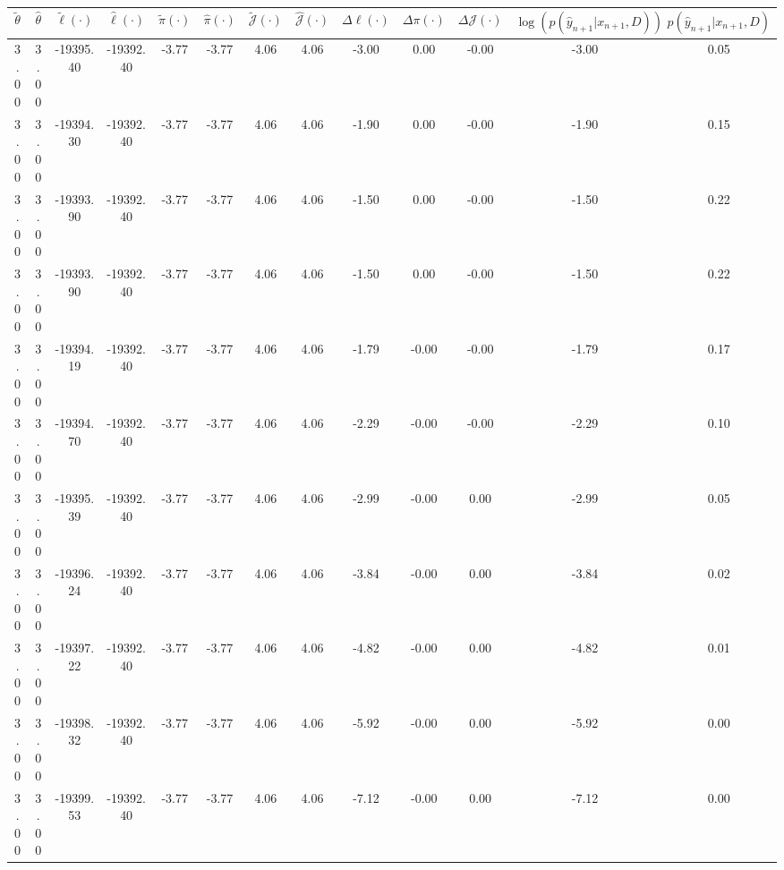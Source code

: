 \begin{table}[htbp]
        \centering
        \tiny
        \begin{adjustbox}{angle=90}
            \begin{tabular}{|c|c|c|c|c|c|c|c|c|c|c|c|c|}
                \hline
                 $\tilde{\theta}$ & $\hat{\theta}$ & $\tilde{\ell}(\cdot)$ & $\hat{\ell}(\cdot)$ & $\tilde{\pi}(\cdot)$ & $\hat{\pi}(\cdot)$ & $\tilde{\mathcal{J}}(\cdot)$ & $\hat{\mathcal{J}}(\cdot)$ & $\Delta \ell(\cdot)$ & $\Delta \pi(\cdot)$ & $\Delta \mathcal{J}(\cdot)$ & $\log(p(\hat{y}_{n+1}|x_{n+1}, D))$ & $p(\hat{y}_{n+1}|x_{n+1}, D)$ \\
                \hline
                 3.00 & 3.00 & -19395.40 & -19392.40 & -3.77 & -3.77 & 4.06 & 4.06 & -3.00 & 0.00 & -0.00 & -3.00 & 0.05\\ \hline
 3.00 & 3.00 & -19394.30 & -19392.40 & -3.77 & -3.77 & 4.06 & 4.06 & -1.90 & 0.00 & -0.00 & -1.90 & 0.15\\ \hline
 3.00 & 3.00 & -19393.90 & -19392.40 & -3.77 & -3.77 & 4.06 & 4.06 & -1.50 & 0.00 & -0.00 & -1.50 & 0.22\\ \hline
 3.00 & 3.00 & -19393.90 & -19392.40 & -3.77 & -3.77 & 4.06 & 4.06 & -1.50 & 0.00 & -0.00 & -1.50 & 0.22\\ \hline
 3.00 & 3.00 & -19394.19 & -19392.40 & -3.77 & -3.77 & 4.06 & 4.06 & -1.79 & -0.00 & -0.00 & -1.79 & 0.17\\ \hline
 3.00 & 3.00 & -19394.70 & -19392.40 & -3.77 & -3.77 & 4.06 & 4.06 & -2.29 & -0.00 & -0.00 & -2.29 & 0.10\\ \hline
 3.00 & 3.00 & -19395.39 & -19392.40 & -3.77 & -3.77 & 4.06 & 4.06 & -2.99 & -0.00 & 0.00 & -2.99 & 0.05\\ \hline
 3.00 & 3.00 & -19396.24 & -19392.40 & -3.77 & -3.77 & 4.06 & 4.06 & -3.84 & -0.00 & 0.00 & -3.84 & 0.02\\ \hline
 3.00 & 3.00 & -19397.22 & -19392.40 & -3.77 & -3.77 & 4.06 & 4.06 & -4.82 & -0.00 & 0.00 & -4.82 & 0.01\\ \hline
 3.00 & 3.00 & -19398.32 & -19392.40 & -3.77 & -3.77 & 4.06 & 4.06 & -5.92 & -0.00 & 0.00 & -5.92 & 0.00\\ \hline
 3.00 & 3.00 & -19399.53 & -19392.40 & -3.77 & -3.77 & 4.06 & 4.06 & -7.12 & -0.00 & 0.00 & -7.12 & 0.00\\ \hline
            \end{tabular}
        \end{adjustbox}
        \caption{}
        \label{}
    \end{table}
    